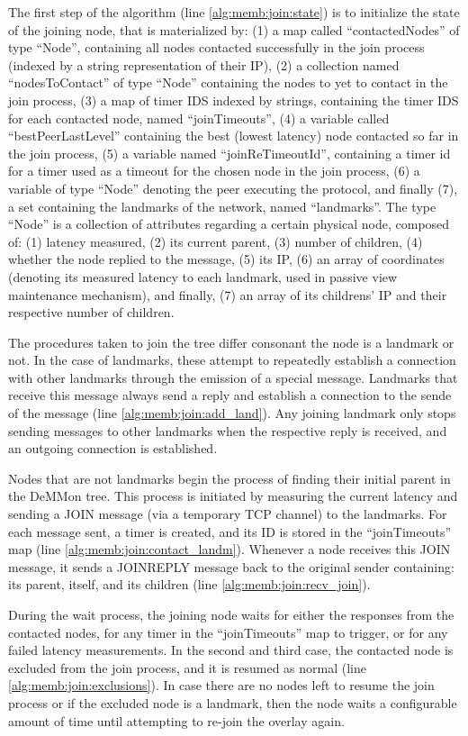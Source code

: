 The first step of the algorithm (line \ref{alg:memb:join:state}) is to initialize the state of the joining node, that is materialized by: (1) a map called ``contactedNodes'' of type ``Node'', containing all nodes contacted successfully in the join process (indexed by a string representation of their IP), (2) a collection named ``nodesToContact'' of type ``Node'' containing the nodes to yet to contact in the join process, (3) a map of timer IDS indexed by strings, containing the timer IDS for each contacted node, named ``joinTimeouts'', (4) a variable called ``bestPeerLastLevel'' containing the best (lowest latency) node contacted so far in the join process, (5) a variable named ``joinReTimeoutId'', containing a timer id for a timer used as a timeout for the chosen node in the join process, (6) a variable of type ``Node'' denoting the peer executing the protocol, and finally (7), a set containing the landmarks of the network, named ``landmarks''. The type ``Node'' is a collection of attributes regarding a certain physical node, composed of: (1) latency measured, (2) its current parent, (3) number of children, (4) whether the node replied to the message, (5) its IP, (6) an array of coordinates (denoting its measured latency to each landmark, used in passive view maintenance mechanism), and finally, (7) an array of its childrens' IP and their respective number of children.
 
The procedures taken to join the tree differ consonant the node is a landmark or not. In the case of landmarks, these attempt to repeatedly establish a connection with other landmarks through the emission of a special message. Landmarks that receive this message always send a reply and establish a connection to the sende of the message (line \ref{alg:memb:join:add_land}). Any joining landmark only stops sending messages to other landmarks when the respective reply is received, and an outgoing connection is established.

Nodes that are not landmarks begin the process of finding their initial parent in the DeMMon tree. This process is initiated by measuring the current latency and sending a JOIN message (via a temporary TCP channel) to the landmarks. For each message sent, a timer is created, and its ID is stored in the ``joinTimeouts'' map (line \ref{alg:memb:join:contact_landm}). Whenever a node receives this JOIN message, it sends a JOINREPLY message back to the original sender containing: its parent, itself, and its children (line \ref{alg:memb:join:recv_join}).

During the wait process, the joining node waits for either the responses from the contacted nodes, for any timer in the ``joinTimeouts'' map to trigger, or for any failed latency measurements. In the second and third case, the contacted node is excluded from the join process, and it is resumed as normal (line \ref{alg:memb:join:exclusions}). In case there are no nodes left to resume the join process or if the excluded node is a landmark, then the node waits a configurable amount of time until attempting to re-join the overlay again. 

